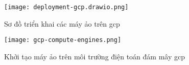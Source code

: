 \begin{table}[h]
    \centering
    \caption{Phân bố vai trò và địa chỉ IP của các máy chủ trong VPN Wireguard}
    \label{tab:wireguard-distribution}
\end{table}

\begin{figure}[h]
    \centering
    \texttt{[image: deployment-gcp.drawio.png]}
    \caption{Sơ đồ triển khai các máy ảo trên \gls{gcp}}
    \label{fig:deployment-gcp}
\end{figure}

\begin{figure}[h]
    \centering
    \texttt{[image: gcp-compute-engines.png]}
    \caption{Khởi tạo máy ảo trên môi trường điện toán đám mây \gls{gcp}}
\end{figure}

